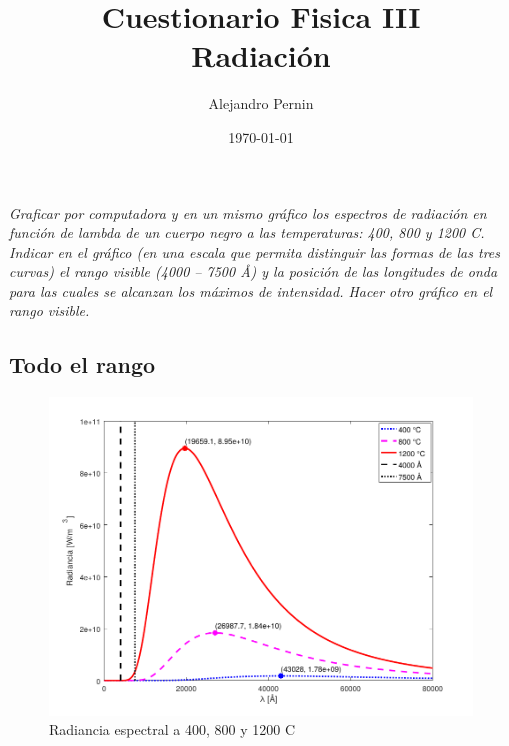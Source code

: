 \documentclass[10pt,a4paper]{article}
\title{Cuestionario Fisica III \\ Radiación}
\author{
        Alejandro Pernin
}
\date{\today}
\begin{document}

	\maketitle


	\section{}\label{1}
		\textit{
		Graficar por computadora y en un mismo gráfico los espectros de radiación en función
		de lambda de un cuerpo negro a las temperaturas: 400, 800 y 1200 \textdegree C. Indicar en el gráfico
		(en una escala que permita distinguir las formas de las tres curvas) el rango visible (4000 –
		7500 Å) y la posición de las longitudes de onda para las cuales se alcanzan los máximos de
		intensidad. Hacer otro gráfico en el rango visible.
		}



		\subsection{Todo el rango}
			\begin{figure}[H]
				\centering\includegraphics[scale=1]{images/todo.pdf}\caption{Radiancia espectral a 400, 800 y 1200 \textdegree C}
			\end{figure}
	
\end{document}

